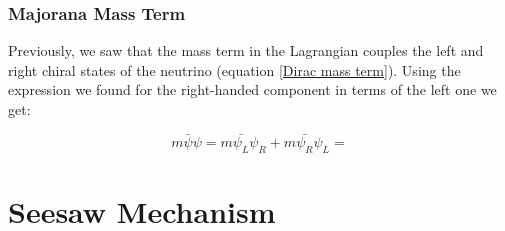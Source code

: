 \subsubsection{Majorana Mass Term}

Previously, we saw that the mass term in the Lagrangian couples the left and right chiral states of the neutrino (equation \ref{Dirac mass term}). Using the expression we found for the right-handed component in terms of the left one we get:

\begin{equation}
m \bar{\psi}\psi = m \bar{\psi_L} \psi_R + m \bar{\psi_R}\psi_L = 
\end{equation}





\section{Seesaw Mechanism}

